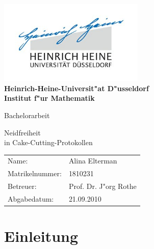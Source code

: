 \documentclass[11pt, a4paper, twoside]{article}
\numberwithin{equation}{section}
\begin{document}
\begin{titlepage}
\begin{center}
\includegraphics[height=4cm]{hhulogo.jpg}\\
\vspace{1em}
\textbf{
\Large Heinrich-Heine-Universit"at D"usseldorf\\
\smallskip
\Large Institut f"ur Mathematik\\
\smallskip}

\vspace{3em}
{\Huge Bachelorarbeit}

\vspace{4em} {\Huge Neidfreiheit \\ \vspace{1em} in Cake-Cutting-Protokollen}
\end{center}

\vfill

\begin{center}
{\large
\begin{tabular}[l]{ll}
Name: & Alina Elterman\\
Matrikelnummer: & 1810231\\
Betreuer: & Prof. Dr. J"org Rothe\\
Abgabedatum: & 21.09.2010
\end{tabular}
}
\end{center}
\end{titlepage}
\newpage
\thispagestyle{empty}
\tableofcontents
\newpage
{}
\setcounter{page}{1}
\thispagestyle{empty}
\listoffigures
\newpage
\section{Einleitung}
\end{document}
